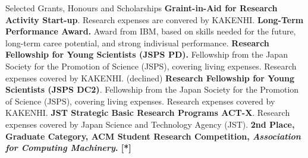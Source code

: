 \begin{rubric}{Selected Grants, Honours and Scholarships}
  \entry*[2024] \textbf{Graint-in-Aid for Research Activity Start-up}. Research expenses are convered by KAKENHI.
  \entry*[2023] \textbf{Long-Term Performance Award.}
  Award from IBM, based on skills needed for the future, long-term caree potential, and strong indivisual performance.
  \entry*[2023] \textbf{Research Fellowship for Young Scientists (JSPS PD).}
  Fellowship from the Japan Society for the Promotion of Science (JSPS), covering
  living expenses. Research expenses covered by KAKENHI. (declined)
  \entry*[2021] \textbf{Research Fellowship for Young Scientists (JSPS DC2)}.
  Fellowship from the Japan Society for the Promotion of Science (JSPS), covering
  living expenses. Research expenses covered by KAKENHI.
  \entry*[2020] \textbf{JST Strategic Basic Research Programs ACT-X}. Research
  expenses covered by Japan Science and Technology Agency (JST).
  \entry*[2019] \textbf{2nd Place, Graduate Category, ACM Student Research
    Competition, \textit{Association for Computing Machinery}. [*]}
\end{rubric}
